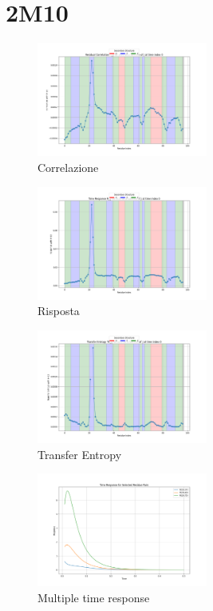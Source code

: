\documentclass[Lau,binding=0.6cm,oneside,noexaminfo]{sapthesis}
\begin{document}
\section{2M10}
\begin{figure}[H]
    \centering                            
    \includegraphics[width=0.5\textwidth]{"images/2m10Residual Correlation C_ij for i=22 as a function of j at time index 0.png"}
    \caption{Correlazione}
\end{figure}
\begin{figure}[H]
    \centering
    \includegraphics[width=0.5\textwidth]{"images/2m10Time Response R_ij for i=22 as a function of j at time index 0.png"}
    \caption{Risposta}
\end{figure}

\begin{figure}[H]
    \centering
    \includegraphics[width=0.5\textwidth]{"images/2m10Transfer Entropy TE_ij for i=22 as a function of j at time index 0.png"}
    \caption{Transfer Entropy}
\end{figure}
\begin{figure}[H]
    \centering
    \includegraphics[width=0.5\textwidth]{"images/2m10Multiple_time_resposne.png"}
    \caption{Multiple time response}
\end{figure}
\end{document}
